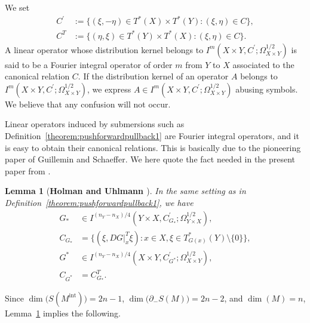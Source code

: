 \documentclass[a4paper,11pt,reqno]{amsart}
\numberwithin{equation}{section}
\newtheorem{lemma}[theorem]{Lemma}
\theoremstyle{definition}
\theoremstyle{remark}
\begin{document}
We set 
%
%
\begin{align*} 
  C^\prime
& :=
  \{(\xi,-\eta) \in T^\ast(X){\times}T^\ast(Y) : (\xi,\eta) \in C\}, 
\\
  C^T
& :=
  \{(\eta,\xi) \in T^\ast(Y){\times}T^\ast(X) : (\xi,\eta) \in C\}.
\end{align*}
%
%
A linear operator whose distribution kernel belongs to $I^m(X{\times}Y,C^\prime;\Omega_{X{\times}Y}^{1/2})$ is said to be a Fourier integral operator of order $m$ from $Y$ to $X$ associated to the canonical relation $C$. 
If the distribution kernel of an operator $A$ belongs to $I^m(X{\times}Y,C^\prime;\Omega_{X{\times}Y}^{1/2})$, we express $A \in I^m(X{\times}Y,C^\prime;\Omega_{X{\times}Y}^{1/2})$ abusing symbols. We believe that any confusion will not occur. 
%
%
\par
%
%
Linear operators induced by submersions such as Definition~\ref{theorem:pushforwardpullback1} are Fourier integral operators, and it is easy to obtain their canonical relations. This is basically due to the pioneering paper \cite{GuilleminSchaeffer} of Guillemin and Schaeffer. We here quote the fact needed in the present paper from \cite{HolmanUhlmann}. 
%
%
\begin{lemma}[{\bf Holman and Uhlmann \cite[Lemma~1]{HolmanUhlmann}}]
\label{theorem:pushforwardpullback2}
In the same setting as in Definition~\ref{theorem:pushforwardpullback1}, we have
%
%
\begin{align*}
  G_\ast
& \in 
  I^{(n_Y-n_X)/4}(Y{\times}X,C_{G_\ast}^\prime;\Omega_{Y{\times}X}^{1/2}),
\\
  C_{G_\ast}
& =
  \bigl\{
  (\xi,DG\vert^T_x\xi)
  : 
  x \in X, 
  \xi \in T^\ast_{G(x)}(Y)\setminus\{0\}
  \bigr\},
\\
  G^\ast
& \in 
  I^{(n_Y-n_X)/4}(X{\times}Y,C_{G^\ast}^\prime;\Omega_{X{\times}Y}^{1/2}),
\\
  C_{G^\ast}
& =
  C_{G_\ast}^T.
\end{align*}
%
%
\end{lemma}
%
%
Since 
$\operatorname{dim}\bigl(S(M^\text{int})\bigr)=2n-1$, 
$\operatorname{dim}\bigl(\partial_-S(M)\bigr)=2n-2$, 
and 
$\operatorname{dim}(M)=n$, Lemma~\ref{theorem:pushforwardpullback2} implies the following. 
%
%
\end{document}

